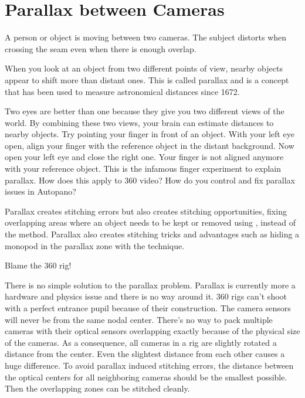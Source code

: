 \section{Parallax between Cameras}
\pagecolor{white}
\label{chap:37}
\begin{fullwidth}

\problem

{\large A person or object is moving between two cameras. The subject distorts when crossing the seam even when there is enough overlap. \par}

When you look at an object from two different points of view, nearby objects appear to shift more than distant ones. This is called parallax and is a concept that has been used to measure astronomical distances since 1672.


Two eyes are better than one because they give you two different views of the world. By combining these two views, your brain can estimate distances to nearby objects. Try pointing your finger in front of an object. With your left eye open, align your finger with the reference object in the distant background. Now open your left eye and close the right one. Your finger is not aligned anymore with your reference object. This is the infamous finger experiment to explain parallax. How does this apply to 360 video? How do you control and fix parallax issues in Autopano?
\clearpage
\solutions

Parallax creates stitching errors but also creates stitching opportunities, fixing overlapping areas where an object needs to be kept or removed using \textbf{}, instead of the \textbf{} method. Parallax also creates stitching tricks and advantages such as hiding a monopod in the parallax zone with the \textbf{} technique.

{\large Blame the 360 rig! \par}

There is no simple solution to the parallax problem. Parallax is currently more a hardware and physics issue and there is no way around it. 360 rigs can't shoot with a perfect entrance pupil because of their construction. The camera sensors will never be from the same nodal center. There’s no way to pack multiple cameras with their optical sensors overlapping exactly because of the physical size of the cameras. As a consequence, all cameras in a rig are slightly rotated a distance from the center. Even the slightest distance from each other causes a huge difference. To avoid parallax induced stitching errors, the distance between the optical centers for all neighboring cameras should be the smallest possible. Then the overlapping zones can be stitched cleanly. 


\end{fullwidth}
